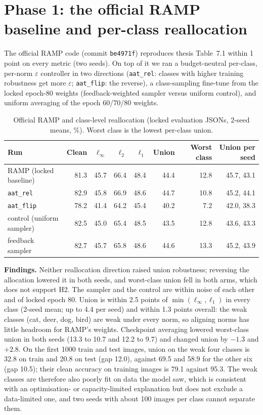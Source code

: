 \documentclass[11pt]{article}
\begin{document}
\section{Phase 1: the official RAMP baseline and per-class reallocation}
The official RAMP code (commit \texttt{be4971f}) reproduces thesis Table~7.1 within 1 point on every metric (two seeds). On top of it we ran a budget-neutral
per-class, per-norm $\varepsilon$ controller in two directions (\texttt{aat\_rel}: classes with higher training robustness get more $\varepsilon$;
\texttt{aat\_flip}: the reverse), a class-sampling fine-tune from the locked epoch-80 weights (feedback-weighted sampler versus uniform control), and uniform averaging of the epoch 60/70/80 weights.

\begin{table}[h]\centering\small
\caption{Official RAMP and class-level reallocation (locked evaluation JSONs, 2-seed means, \%). Worst class is the lowest per-class union.}\label{tab:ramp}
\begin{tabular}{lrrrrrrr}\toprule
Run & Clean & $\ell_\infty$ & $\ell_2$ & $\ell_1$ & Union & Worst class & Union per seed\\\midrule
RAMP (locked baseline) & 81.3 & 45.7 & 66.4 & 48.4 & 44.4 & 12.8 & 45.7, 43.1\\
\texttt{aat\_rel}      & 82.9 & 45.8 & 66.9 & 48.6 & 44.7 & 10.8 & 45.2, 44.1\\
\texttt{aat\_flip}     & 78.2 & 41.4 & 64.2 & 45.4 & 40.2 & 7.2  & 42.0, 38.3\\
control (uniform sampler) & 82.5 & 45.0 & 65.4 & 48.5 & 43.5 & 12.8 & 43.6, 43.3\\
feedback sampler        & 82.7 & 45.7 & 65.8 & 48.6 & 44.6 & 13.3 & 45.2, 43.9\\\bottomrule
\end{tabular}
\end{table}

\textbf{Findings.} Neither reallocation direction raised union robustness; reversing the allocation lowered it in both seeds, and worst-class union fell in both arms, which does not support H2.
The sampler and the control are within noise of each other and of locked epoch 80. Union is within 2.5 points of $\min(\ell_\infty,\ell_1)$ in every class (2-seed mean; up to 4.4 per seed) and within 1.3 points overall:
the weak classes (cat, deer, dog, bird) are weak under every norm, so aligning norms has little headroom for RAMP's weights.
Checkpoint averaging lowered worst-class union in both seeds (13.3 to 10.7 and 12.2 to 9.7) and changed union by $-1.3$ and $+2.8$.
On the first 1000 train and test images, union on the weak four classes is 32.8 on train and 20.8 on test (gap 12.0), against 69.5 and 58.9 for the other six (gap 10.5); their clean accuracy on training images is 79.1 against 95.3.
The weak classes are therefore also poorly fit on data the model saw, which is consistent with an optimisation- or capacity-limited explanation but does not exclude a data-limited one, and two seeds with about 100 images per class cannot separate them.
\end{document}
